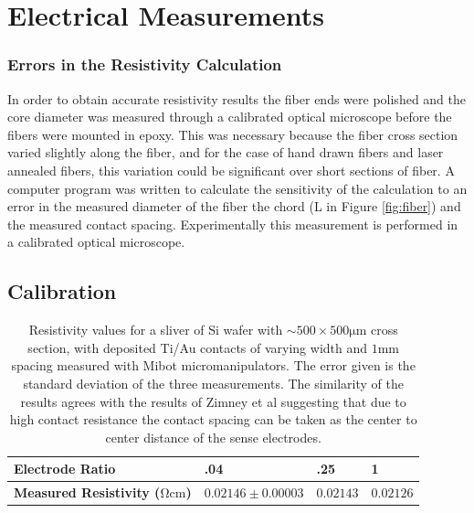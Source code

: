 

\section{Electrical Measurements}

\subsubsection{Errors in the Resistivity Calculation}
In order to obtain accurate resistivity results the fiber ends were polished and the core diameter was measured through a calibrated optical microscope before the fibers were mounted in epoxy. This was necessary because the 
fiber cross section varied slightly along the fiber, and for the case of hand drawn fibers and laser annealed fibers, this variation could be significant over short sections of fiber.  A computer program was written to calculate the sensitivity of the calculation to an error in the measured diameter of the fiber the chord (L in Figure \ref{fig:fiber}) and the measured contact spacing. Experimentally this measurement is performed in a calibrated optical microscope. 

\subsection{Calibration }

\begin{table}[!htb]
\begin{center}
\begin{tabular}{ | l | l | l | l |}
\hline
\textbf{Electrode Ratio}&\textbf{.04} & \textbf{.25} & \textbf{1} \\ \hline
\textbf{Measured Resistivity ($\si{\ohm \cm}$)} & $ 0.02146 \pm 0.00003$& $0.02143$&$0.02126 $\\\hline

\end{tabular}
\end{center}
\caption{Resistivity values for a sliver of Si wafer with $\sim 500 \times 500 \si{\micro \meter}$ cross section, with deposited Ti/Au contacts of varying width and $1 \si{\mm}$ spacing measured with Mibot micromanipulators. The error given is the standard deviation of the three measurements. The similarity of the results agrees with the results of Zimney et al \cite{Zimney2007CorrectionStudy} suggesting that due to high contact resistance the contact spacing can be taken as the center to center distance of the sense electrodes.}

\label{Tabcorrection}
\end{table}

